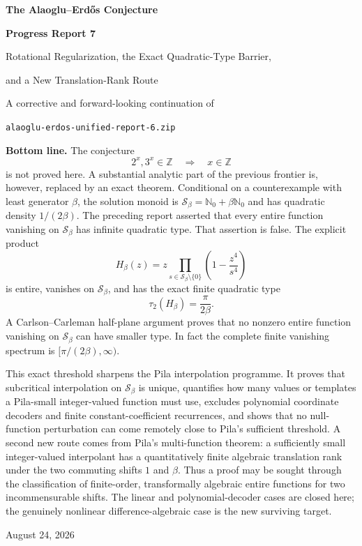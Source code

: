 \documentclass[11pt,oneside]{article}
\theoremstyle{definition}
\theoremstyle{remark}
\newcommand{\Nzero}{\mathbb N_0}
\newcommand{\Z}{\mathbb Z}
\newcommand{\Sbeta}{\mathcal S_\beta}
\begin{document}

\begin{titlepage}
\centering
\vspace*{0.65cm}
{\Huge\bfseries The Alaoglu--Erd\H{o}s Conjecture\par}
\vspace{0.22cm}
{\LARGE\bfseries Progress Report 7\par}
\vspace{0.75cm}
{\LARGE Rotational Regularization, the Exact Quadratic-Type Barrier,\par}
\vspace{0.12cm}
{\LARGE and a New Translation-Rank Route\par}
\vspace{0.9cm}
{\large A corrective and forward-looking continuation of\par}
\vspace{0.1cm}
{\large \texttt{alaoglu-erdos-unified-report-6.zip}\par}
\vfill
\begin{minipage}{0.92\textwidth}
\small
\textbf{Bottom line.}
The conjecture
\[
  2^x,3^x\in\Z\quad\Longrightarrow\quad x\in\Z
\]
is not proved here.  A substantial analytic part of the previous frontier is, however,
replaced by an exact theorem.  Conditional on a counterexample with least generator
$\beta$, the solution monoid is $\Sbeta=\Nzero+\beta\Nzero$ and has quadratic density
$1/(2\beta)$.  The preceding report asserted that every entire function vanishing on
$\Sbeta$ has infinite quadratic type.  That assertion is false.  The explicit product
\[
 H_\beta(z)=z\prod_{s\in\Sbeta\setminus\{0\}}
                 \left(1-\frac{z^4}{s^4}\right)
\]
is entire, vanishes on $\Sbeta$, and has the exact finite quadratic type
\[
  \tau_2(H_\beta)=\frac{\pi}{2\beta}.
\]
A Carlson--Carleman half-plane argument proves that no nonzero entire function vanishing
on $\Sbeta$ can have smaller type.  In fact the complete finite vanishing spectrum is
$[\pi/(2\beta),\infty)$.

This exact threshold sharpens the Pila interpolation programme.  It proves that
subcritical interpolation on $\Sbeta$ is unique, quantifies how many values or templates a
Pila-small integer-valued function must use, excludes polynomial coordinate decoders and
finite constant-coefficient recurrences, and shows that no null-function perturbation can
come remotely close to Pila's sufficient threshold.  A second new route comes from Pila's
multi-function theorem: a sufficiently small integer-valued interpolant has a quantitatively
finite algebraic translation rank under the two commuting shifts $1$ and $\beta$.  Thus a
proof may be sought through the classification of finite-order, transformally algebraic
entire functions for two incommensurable shifts.  The linear and polynomial-decoder cases
are closed here; the genuinely nonlinear difference-algebraic case is the new surviving
target.
\end{minipage}
\vfill
{\large August 24, 2026\par}
\end{titlepage}
\end{document}
